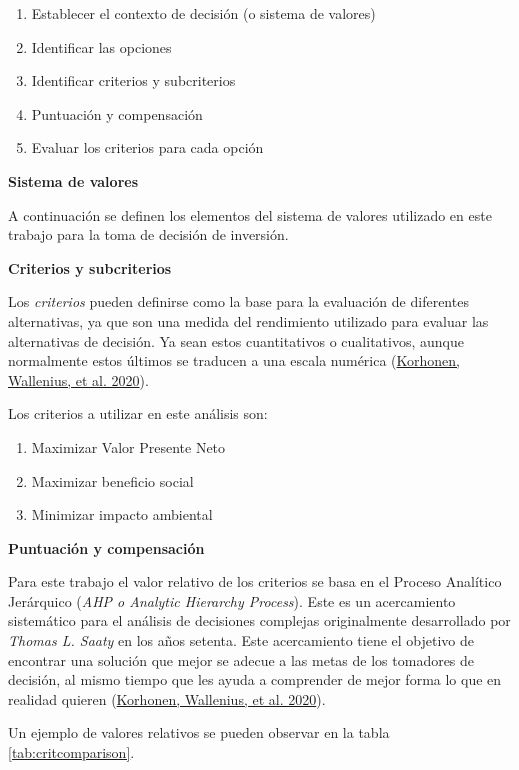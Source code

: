 \documentclass[
]{book}
\providecommand{\tightlist}{%
  \setlength{\itemsep}{0pt}\setlength{\parskip}{0pt}}
\begin{document}
\begin{enumerate}
\def\labelenumi{\arabic{enumi}.}
\tightlist
\item
  Establecer el contexto de decisión (o sistema de valores)
\item
  Identificar las opciones
\item
  Identificar criterios y subcriterios
\item
  Puntuación y compensación
\item
  Evaluar los criterios para cada opción
\end{enumerate}

\textbf{Sistema de valores}

A continuación se definen los elementos del sistema de valores utilizado en este trabajo para la toma de decisión de inversión.

\textbf{Criterios y subcriterios}

Los \emph{criterios} pueden definirse como la base para la evaluación de diferentes alternativas, ya que son una medida del rendimiento utilizado para evaluar las alternativas de decisión. Ya sean estos cuantitativos o cualitativos, aunque normalmente estos últimos se traducen a una escala numérica (\protect\hyperlink{ref-Korhonen2020}{Korhonen, Wallenius, et al. 2020}).

Los criterios a utilizar en este análisis son:

\begin{enumerate}
\def\labelenumi{\arabic{enumi}.}
\tightlist
\item
  Maximizar Valor Presente Neto
\item
  Maximizar beneficio social
\item
  Minimizar impacto ambiental
\end{enumerate}

\textbf{Puntuación y compensación}

Para este trabajo el valor relativo de los criterios se basa en el Proceso Analítico Jerárquico (\emph{AHP o Analytic Hierarchy Process}). Este es un acercamiento sistemático para el análisis de decisiones complejas originalmente desarrollado por \emph{Thomas L. Saaty} en los años setenta. Este acercamiento tiene el objetivo de encontrar una solución que mejor se adecue a las metas de los tomadores de decisión, al mismo tiempo que les ayuda a comprender de mejor forma lo que en realidad quieren (\protect\hyperlink{ref-Korhonen2020}{Korhonen, Wallenius, et al. 2020}).

Un ejemplo de valores relativos se pueden observar en la tabla \ref{tab:critcomparison}.
\end{document}
